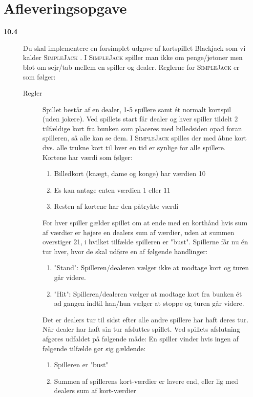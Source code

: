 \documentclass[a4paper,12pt]{article}
\newcommand{\sbl}{\textsc{SimpleJack }}
\begin{document}
\section*{Afleveringsopgave}
\begin{description}
\item[\textbf{10.4}] Du skal implementere en forsimplet udgave af kortspillet Blackjack som vi kalder \sbl. I \sbl spiller man ikke om penge/jetoner men blot om sejr/tab mellem en spiller og dealer.  Reglerne for \sbl er som følger:
  \begin{description}
  \item[Regler]
    Spillet består af en dealer, 1-5 spillere samt ét normalt kortspil (uden jokere). Ved spillets start får dealer og hver spiller tildelt 2 tilfældige kort fra bunken som placeres med billedsiden opad foran spilleren, så alle kan se dem. I \sbl spilles der med åbne kort dvs. alle trukne kort til hver en tid er synlige for alle spillere.  Kortene har værdi som følger:
    \begin{enumerate}
    \item Billedkort (knægt, dame og konge) har værdien 10
    \item Es kan antage enten værdien 1 eller 11
    \item Resten af kortene har den påtrykte værdi
    \end{enumerate}
    For hver spiller gælder spillet om at ende med en korthånd hvis sum af værdier er højere en dealers sum af værdier, 
    uden at summen overstiger 21, i hvilket tilfælde spilleren er "bust".
    Spillerne får nu én tur hver, hvor de skal udføre en af følgende handlinger:
    \begin{enumerate}
    \item "Stand": Spilleren/dealeren vælger ikke at modtage kort og turen går videre.
    \item "Hit": Spilleren/dealeren vælger at modtage kort fra bunken ét ad gangen indtil han/hun 
      vælger at stoppe og turen går videre.
    \end{enumerate}
    Det er dealers tur til sidst efter alle andre spillere har haft deres tur. Når dealer har haft sin tur afsluttes spillet.
    Ved spillets afslutning afgøres udfaldet på følgende måde:
    En spiller vinder hvis ingen af følgende tilfælde gør sig gældende:
    \begin{enumerate}
    \item Spilleren er "bust"
    \item Summen af spillerens kort-værdier er lavere end, eller lig med dealers sum af kort-værdier

\end{enumerate}
\end{description}
\end{description}
\end{document}
